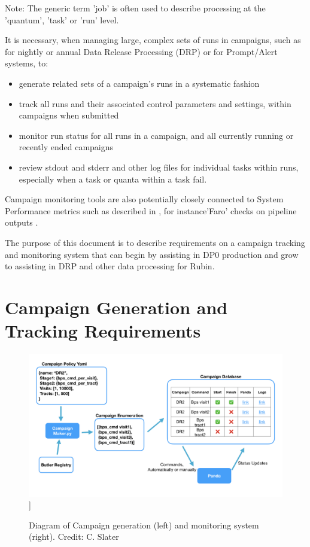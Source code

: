 \documentclass[DM,authoryear,toc]{lsstdoc}
\begin{document}
Note: The generic term 'job' is often used to describe processing at 
the 'quantum', 'task' or 'run' level.

It is necessary, when managing large, complex sets of runs in campaigns, 
such as for nightly or annual Data Release Processing (DRP) or for 
Prompt/Alert systems, to:
\begin{itemize}

\item  generate related sets of a campaign's runs in a 
systematic fashion

\item track all runs and their associated control parameters and settings, 
within campaigns when submitted

\item monitor run status for all runs in a campaign, and all currently
running or recently ended campaigns

\item review stdout and stderr and other log files for individual tasks 
within runs, especially when a task or quanta within a task fail.

\end {itemize}

Campaign monitoring tools are also potentially closely connected to
System Performance metrics such as described in \cite{DMTN-173}, for instance'Faro' checks on pipeline outputs \cite{DMTR-311}.

The purpose of this document is to describe requirements on a campaign
tracking and monitoring system that can begin by assisting in DP0 
\cite{RTN-001} production and grow to assisting in DRP and other 
data processing for Rubin.

\section{Campaign Generation and Tracking Requirements}

\begin{figure}
\includegraphics[width=\textwidth]{CampaignTooling.jpg}]
\caption{Diagram of Campaign generation (left) and monitoring system (right).
Credit: C. Slater}
\label{CampaignTooling}
\end{figure}
\end{document}

